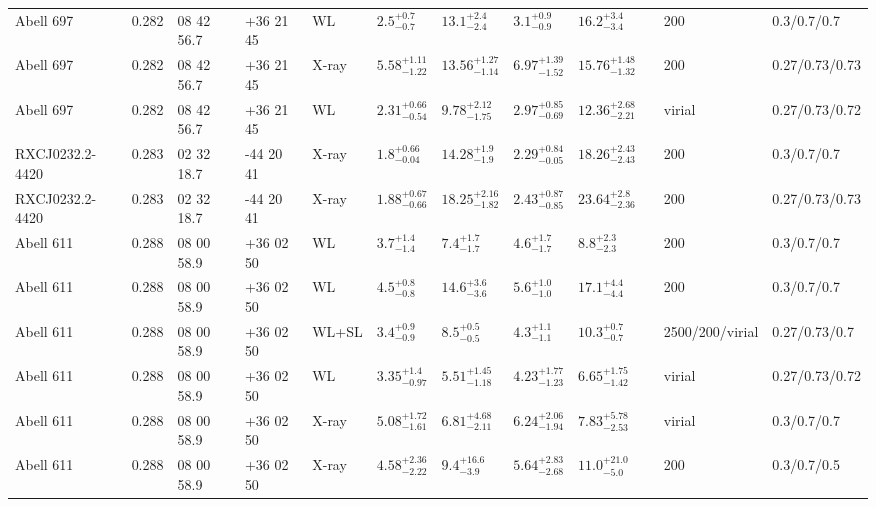 \begin{landscape}
\begin{center}
{\begin{longtable}{llllllllllll}
Abell 697 & 0.282 & 08 42 56.7 & +36 21 45 & WL & ${2.5}^{+0.7}_{-0.7}$ & ${13.1}^{+2.4}_{-2.4}$ & ${3.1}^{+0.9}_{-0.9}$ & ${16.2}^{+3.4}_{-3.4}$ & \citet{SE14.1} & 200 & 0.3/0.7/0.7 \\
Abell 697 & 0.282 & 08 42 56.7 & +36 21 45 & X-ray & ${5.58}^{+1.11}_{-1.22}$ & ${13.56}^{+1.27}_{-1.14}$ & ${6.97}^{+1.39}_{-1.52}$ & ${15.76}^{+1.48}_{-1.32}$ & \citet{BA14.1} & 200 & 0.27/0.73/0.73 \\
Abell 697 & 0.282 & 08 42 56.7 & +36 21 45 & WL & ${2.31}^{+0.66}_{-0.54}$ & ${9.78}^{+2.12}_{-1.75}$ & ${2.97}^{+0.85}_{-0.69}$ & ${12.36}^{+2.68}_{-2.21}$ & \citet{OK10.1} & virial & 0.27/0.73/0.72 \\
RXCJ0232.2-4420 & 0.283 & 02 32 18.7 & -44 20 41 & X-ray & ${1.8}^{+0.66}_{-0.04}$ & ${14.28}^{+1.9}_{-1.9}$ & ${2.29}^{+0.84}_{-0.05}$ & ${18.26}^{+2.43}_{-2.43}$ & \citet{ET11.1} & 200 & 0.3/0.7/0.7 \\
RXCJ0232.2-4420 & 0.283 & 02 32 18.7 & -44 20 41 & X-ray & ${1.88}^{+0.67}_{-0.66}$ & ${18.25}^{+2.16}_{-1.82}$ & ${2.43}^{+0.87}_{-0.85}$ & ${23.64}^{+2.8}_{-2.36}$ & \citet{BA14.1} & 200 & 0.27/0.73/0.73 \\
Abell 611 & 0.288 & 08 00 58.9 & +36 02 50 & WL & ${3.7}^{+1.4}_{-1.4}$ & ${7.4}^{+1.7}_{-1.7}$ & ${4.6}^{+1.7}_{-1.7}$ & ${8.8}^{+2.3}_{-2.3}$ & \citet{SE14.1} & 200 & 0.3/0.7/0.7 \\
Abell 611 & 0.288 & 08 00 58.9 & +36 02 50 & WL & ${4.5}^{+0.8}_{-0.8}$ & ${14.6}^{+3.6}_{-3.6}$ & ${5.6}^{+1.0}_{-1.0}$ & ${17.1}^{+4.4}_{-4.4}$ & \citet{SE14.1} & 200 & 0.3/0.7/0.7 \\
Abell 611 & 0.288 & 08 00 58.9 & +36 02 50 & WL+SL & ${3.4}^{+0.9}_{-0.9}$ & ${8.5}^{+0.5}_{-0.5}$ & ${4.3}^{+1.1}_{-1.1}$ & ${10.3}^{+0.7}_{-0.7}$ & \citet{ME14.1} & 2500/200/virial & 0.27/0.73/0.7 \\
Abell 611 & 0.288 & 08 00 58.9 & +36 02 50 & WL & ${3.35}^{+1.4}_{-0.97}$ & ${5.51}^{+1.45}_{-1.18}$ & ${4.23}^{+1.77}_{-1.23}$ & ${6.65}^{+1.75}_{-1.42}$ & \citet{OK10.1} & virial & 0.27/0.73/0.72 \\
Abell 611 & 0.288 & 08 00 58.9 & +36 02 50 & X-ray & ${5.08}^{+1.72}_{-1.61}$ & ${6.81}^{+4.68}_{-2.11}$ & ${6.24}^{+2.06}_{-1.94}$ & ${7.83}^{+5.78}_{-2.53}$ & \citet{SC07.1} & virial & 0.3/0.7/0.7 \\
Abell 611 & 0.288 & 08 00 58.9 & +36 02 50 & X-ray & ${4.58}^{+2.36}_{-2.22}$ & ${9.4}^{+16.6}_{-3.9}$ & ${5.64}^{+2.83}_{-2.68}$ & ${11.0}^{+21.0}_{-5.0}$ & \citet{AL03.1} & 200 & 0.3/0.7/0.5 \\

\end{longtable}}
\end{center}
\end{landscape}
